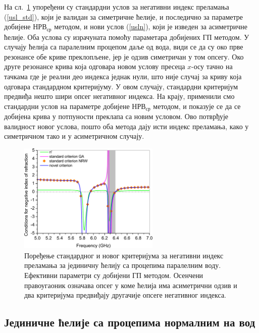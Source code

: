 На сл.~\ref{usl_par} упоређени су стандардни услов за негативни индекс преламања (\ref{usl_std}), који је валидан за симетричне ћелије, и последично за параметре добијене $НРВ_{ср}$ методом, и нови услов (\ref{usln}), који је изведен за асиметричне ћелије. Оба услова су израчуната помоћу параметара добијених ГП методом. У случају ћелија са паралелним процепом даље од вода, види се да су око прве резонансе обе криве преклопљене, јер је одзив симетричан у том опсегу. Око друге резонансе крива која одговара новом услову пресеца $x$-осу тачно на тачкама где је реални део индекса једнак нули, што није случај за криву која одговара стандардном критеријуму. У овом случају, стандардни критеријум предвиђа нешто шири опсег негативног индекса. На крају, применили смо стандардни услов на параметре добијене $НРВ_{ср}$ методом, и показује се да се добијена крива у потпуности преклапа са новим условом. Ово потврђује валидност новог услова, пошто оба метода дају исти индекс преламања, како у симетричном тако и у асиметричном случају.
\begin{figure}[!t]
\centering
\includegraphics[width=0.6\textwidth]{slike/usl_par.pdf}
\caption{Поређење стандардног и новог критеријума за негативни индекс преламања за јединичну ћелију са процепима паралелним воду. Ефективни параметри су добијени ГП методом. Осенчени правоугаоник означава опсег у коме ћелија има асиметрични одзив и два критеријума предвиђају другачије опсеге негативног индекса.}
\label{usl_par}
\end{figure} 
	
\subsection{Јединичне ћелије са процепима нормалним на вод}

